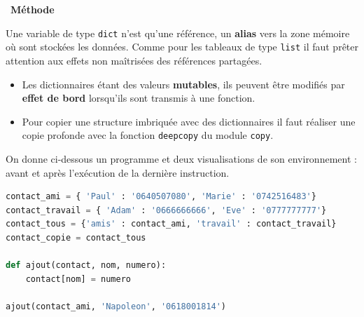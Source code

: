 \documentclass[
  11pt,
]{article}
\newcommand{\passthrough}[1]{#1}
\providecommand{\tightlist}{%
  \setlength{\itemsep}{0pt}\setlength{\parskip}{0pt}}
\newcounter{def}
\newcounter{prog}
\newenvironment{methode}[1]
{\par \medskip    \noindent  
 \begin {bclogo}[arrondi =0.1,logo=\bcoutil, marge=4,noborder = true] {~\textbf{Méthode}   {\itshape #1} }  \par}
{
\end{bclogo}
 \par \bigskip }
\begin{document}
\begin{methode}{}

Une variable de type \passthrough{\lstinline!dict!} n'est qu'une
référence, un \textbf{alias} vers la zone mémoire où sont stockées les
données. Comme pour les tableaux de type \passthrough{\lstinline!list!}
il faut prêter attention aux effets non maîtrisées des références
partagées.

\begin{itemize}
\tightlist
\item
  Les dictionnaires étant des valeurs \textbf{mutables}, ils peuvent
  être modifiés par \textbf{effet de bord} lorsqu'ils sont transmis à
  une fonction.
\item
  Pour copier une structure imbriquée avec des dictionnaires il faut
  réaliser une copie profonde avec la fonction
  \passthrough{\lstinline!deepcopy!} du module
  \passthrough{\lstinline!copy!}.
\end{itemize}

On donne ci-dessous un programme et deux visualisations de son
environnement : avant et après l'exécution de la dernière instruction.

\begin{lstlisting}[language=Python]
contact_ami = { 'Paul' : '0640507080', 'Marie' : '0742516483'}
contact_travail = { 'Adam' : '0666666666', 'Eve' : '0777777777'}
contact_tous = {'amis' : contact_ami, 'travail' : contact_travail}
contact_copie = contact_tous

def ajout(contact, nom, numero):
    contact[nom] = numero

ajout(contact_ami, 'Napoleon', '0618001814')
\end{lstlisting}

\end{methode}
\end{document}
